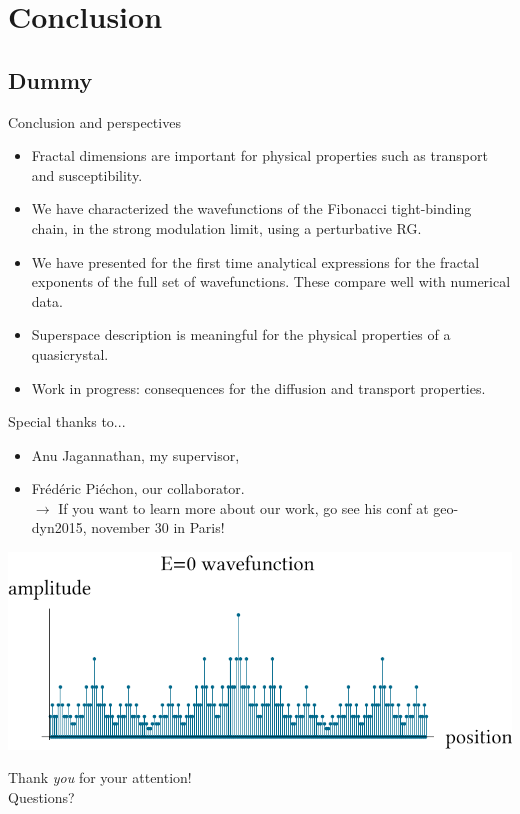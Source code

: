 \documentclass[xcolor=x11names,compress,professionalfonts]{beamer}
\renewcommand{\(}{\begin{columns}}
\renewcommand{\)}{\end{columns}}
\newcommand{\<}[1]{\begin{column}{#1}}
\renewcommand{\>}{\end{column}}
\begin{document}
\section{Conclusion}
\subsection{Dummy}
\begin{frame}{Conclusion and perspectives}
\begin{itemize}
	\item Fractal dimensions are important for physical properties such as transport and susceptibility.
	\item We have characterized the wavefunctions of the Fibonacci tight-binding chain, in the strong modulation limit, using a perturbative RG.
	\item We have presented for the first time analytical expressions for the fractal exponents of the full set of wavefunctions. These compare well with numerical data.
	\item Superspace description is meaningful for the physical properties of a quasicrystal.
	\item Work in progress: consequences for the diffusion and transport properties.
\end{itemize}
\end{frame}

\begin{frame}{Special thanks to...}
\begin{itemize}
	\item Anu Jagannathan, my supervisor,
	\item Frédéric Piéchon, our collaborator. \\
			$\rightarrow$ If you want to learn more about our work, go see his conf at geo-dyn2015, november 30 in Paris!
\end{itemize}

\centering

	\includegraphics[scale=.55]{E0_wavefunction.pdf}	
	
\huge{Thank \emph{you} for your attention! \\Questions?}

\end{frame}
\end{document}
